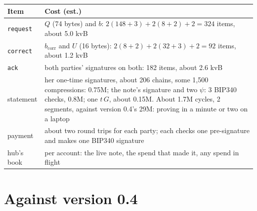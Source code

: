 \documentclass[11pt]{article}
\theoremstyle{plain}
\theoremstyle{definition}
\newcommand{\bcorr}{b_{\mathrm{corr}}}
\newcommand{\tx}[1]{\texttt{#1}}
\begin{document}
\begin{center}
\begin{tabularx}{\linewidth}{lL}
\toprule
Item & Cost (est.) \\
\midrule
\tx{request} & $Q$ (74 bytes) and $b$: $2(148 + 3) + 2(8 + 2) + 2 = 324$ items, about 5.0 kvB \\
\tx{correct} & $\bcorr$ and $U$ (16 bytes): $2(8 + 2) + 2(32 + 3) + 2 = 92$ items, about 1.2 kvB \\
\tx{ack} & both parties' signatures on both: 182 items, about 2.6 kvB \\
statement & her one-time signatures, about 206 chains, some 1,500 compressions: 0.75M; the note's signature and two $\psi$: 3 BIP340 checks, 0.8M; one $t\,G$, about 0.15M. About 1.7M cycles, 2 segments, against version 0.4's 29M: proving in a minute or two on a laptop \\
payment & about two round trips for each party; each checks one pre-signature and makes one BIP340 signature \\
hub's book & per account: the live note, the spend that made it, any spend in flight \\
\bottomrule
\end{tabularx}
\end{center}

\section{Against version 0.4}\label{sec:compare}
\end{document}
